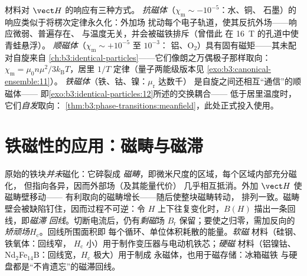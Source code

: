 \begin{remark}[三种磁性]\label{rem:b3:electromagnetism-in-matter:zoo}
材料对 $\vect H$ 的响应有三种方式。
\emph{抗磁体}（$\chi_{\text{m}} \sim -10^{-5}$：水、铜、
石墨）的响应类似于将楞次定律永久化：外加场
扰动每个电子轨道，使其反抗外场——响应微弱、普遍存在、
与温度无关，并会被磁铁排斥（曾借此
在 \qty{16}{T} 的孔道中使青蛙悬浮）。
\emph{顺磁体}（$\chi_{\text{m}} \sim +10^{-5}$ 至 $10^{-3}$：
铝、O$_2$）具有固有磁矩——其未配对自旋来自
\cref{ch:b3:identical-particles}——它们像朗之万偶极子那样取向：
$\chi_{\text{m}} = \mu_0 n\mu^2/3k_{\text{B}}T$，居里
$1/T$ 定律（量子两能级版本见
\cref{exo:b3:canonical-ensemble:11}）。
\emph{铁磁体}（铁、钴、镍：$\mu_{\text{r}}$ 达数千）
是自旋之间还相互“通信”的顺磁体——
即\cref{exo:b3:identical-particles:12}所述的交换耦合——
低于居里温度时，它们\emph{自发}取向：
\cref{thm:b3:phase-transitions:meanfield}，此处正式投入使用。
\end{remark}

\section{铁磁性的应用：磁畴与磁滞}

\begin{definition}[磁畴与磁滞]\label{def:b3:electromagnetism-in-matter:hysteresis}
原始的铁块\emph{并未}磁化：它碎裂成
\emph{磁畴}，即微米尺度的区域，每个区域内部充分磁化，
但指向各异，因而外部场（及其能量代价）
几乎相互抵消。外加 $\vect H$ 使磁畴壁移动——
有利取向的磁畴增长——随后使整块磁畴转动，
排列一致。磁畴壁会被缺陷钉住，因而过程不可逆：令
$H$ 上下往复变化时，$B(H)$ 描出一条回线，即\emph{磁滞
回线}。切断电流后，仍有\emph{剩磁}场
$B_{\text{r}}$ 保留；要使之归零，需加反向的
\emph{矫顽场}$H_{\text{c}}$。回线所围面积即
每个循环、单位体积耗散的能量。\emph{软磁}
材料（硅钢、铁氧体：回线窄，
$H_{\text{c}}$ 小）用于制作变压器与电动机铁芯；\emph{硬磁}
材料（铝镍钴、Nd$_2$Fe$_{14}$B：回线宽，$H_{\text{c}}$ 极大）用于制成
永磁体，也用于磁存储：冰箱磁铁
与硬盘都是“不肯遗忘”的磁滞回线。
\end{definition}

